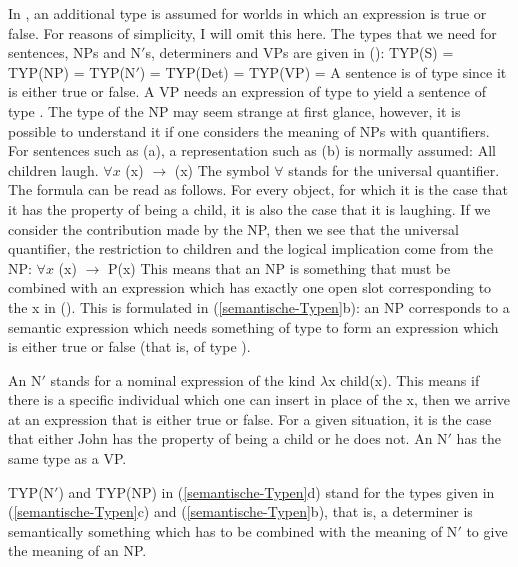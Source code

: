 In , an additional type is assumed for worlds in which an expression is true or false. For reasons of simplicity, I will omit this here. The types
that we need for sentences, NPs and N$'$s, determiners and VPs are given in ():
\eal
\label{semantische-Typen}
\ex TYP(S)   = 
\ex TYP(NP)  = 
\ex TYP(N$'$)  = 
\ex TYP(Det) = 
\ex TYP(VP)  = 
\zl
A sentence is of type  since it is either true or false. A VP needs an expression of type  to yield a sentence of type .
The type of the NP may seem strange at first glance, however, it is possible to understand it if one considers the meaning of NPs with quantifiers.
For sentences such as (a), a representation such as (b) is normally assumed:
\eal
\ex All children laugh.
\ex $\forall x$ (x) $\to$ (x)
\zl
The symbol $\forall$ stands for the universal quantifier. The formula can
be read as follows. For every object, for which it is the case that it has the property of being a
child, it is also the case that it is laughing. If we consider the contribution made by the NP, then we see that
the universal quantifier, the restriction to children and the logical implication come from the NP:
\ea
$\forall x$ (x) $\to$ P(x)
\z
This means that an NP is something that must be combined with an expression which has exactly one open slot corresponding to the x in (). This is formulated in (\ref{semantische-Typen}b):
an NP corresponds to a semantic expression which needs something of type  to form an expression which is either true or false (that is, of type ).

An N$'$ stands for a nominal expression of the kind  $\lambda$x child(x). This means if there is a specific individual which one can insert in place of the x, then we arrive at an
expression that is either true or false. For a given situation, it is the case that either John has the property of being a child or he does not. An N$'$ has the same type as
a VP.

TYP(N$'$) and TYP(NP) in (\ref{semantische-Typen}d) stand for the types given in (\ref{semantische-Typen}c) and
(\ref{semantische-Typen}b), that is, a determiner is semantically something which has to be combined with the meaning of N$'$
to give the meaning of an NP.

